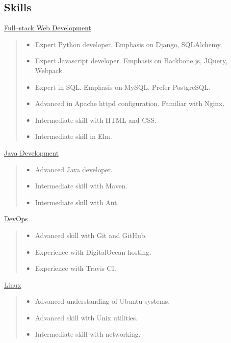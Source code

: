  
\begin{resume}  

\section{Skills}
\underline{Full--stack Web Development}\\
\begin{quote}
\begin{itemize}
\item Expert Python developer. Emphasis on Django, SQLAlchemy.
\item Expert Javascript developer. Emphasis on Backbone.js, JQuery,
  Webpack.
\item Expert in SQL. Emphasis on MySQL. Prefer PostgreSQL.
\item Advanced in Apache httpd configuration. Familiar with Nginx. 
\item Intermediate skill with HTML and CSS.
\item Intermediate skill in Elm.
\end{itemize}
\end{quote}

\underline{Java Development}\\
\begin{quote}
\begin{itemize}
\item Advanced Java developer.
\item Intermediate skill with Maven.
\item Intermediate skill with Ant.
\end{itemize}
\end{quote}

\underline{DevOps}\\
\begin{quote}
\begin{itemize}
\item Advanced skill with Git and GitHub.
\item Experience with DigitalOcean hosting.
\item Experience with Travis CI.
\end{itemize}
\end{quote}

\underline{Linux}\\
\begin{quote}
\begin{itemize}
\item Advanced understanding of Ubuntu systems.
\item Advanced skill with Unix utilities.
\item Intermediate skill with networking.
\end{itemize}
\end{quote}



\end{resume}
